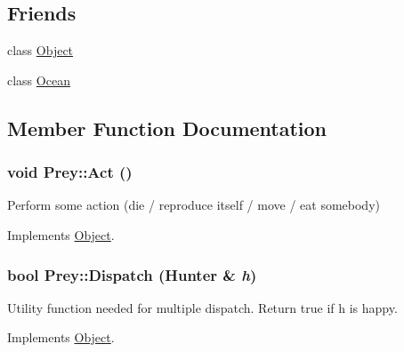 \subsection*{Friends}
\begin{DoxyCompactItemize}
\item 
\hypertarget{classPrey_a0720b5f434e636e22a3ed34f847eec57}{
class \hyperlink{classPrey_a0720b5f434e636e22a3ed34f847eec57}{Object}}
\label{classPrey_a0720b5f434e636e22a3ed34f847eec57}

\item 
\hypertarget{classPrey_afe3874c2dc8ab0fb894a9f3c80bfa1ad}{
class \hyperlink{classPrey_afe3874c2dc8ab0fb894a9f3c80bfa1ad}{Ocean}}
\label{classPrey_afe3874c2dc8ab0fb894a9f3c80bfa1ad}

\end{DoxyCompactItemize}


\subsection{Member Function Documentation}
\hypertarget{classPrey_a940c0a8879376b15dedb7debf9b8f1c8}{
\subsubsection[{Act}]{\setlength{\rightskip}{0pt plus 5cm}void Prey::Act ()}}
\label{classPrey_a940c0a8879376b15dedb7debf9b8f1c8}
Perform some action (die / reproduce itself / move / eat somebody) 

Implements \hyperlink{classObject_a683b351ee47dc69c4117cb9017c467d6}{Object}.

\hypertarget{classPrey_ae1ad92ee4416c74c45a5e4098ba5e327}{
\subsubsection[{Dispatch}]{\setlength{\rightskip}{0pt plus 5cm}bool Prey::Dispatch ({\bf Hunter} \& {\em h})}}
\label{classPrey_ae1ad92ee4416c74c45a5e4098ba5e327}
Utility function needed for multiple dispatch. Return true if h is happy. 

Implements \hyperlink{classObject_a0d0e1f0456837f6736913b1ba374f11d}{Object}.

